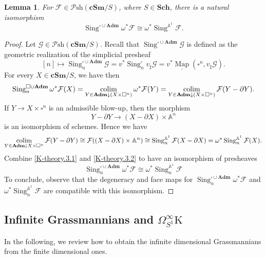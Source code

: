 \documentclass[11pt, a4paper]{amsart}
\newtheorem{lem}[thm]{Lemma}
\theoremstyle{definition}
\numberwithin{equation}{subsection}
\newcommand{\A}{\mathbb{A}}
\newcommand{\Sch}{\mathbf{Sch}}
\newcommand{\cSm}{\mathbf{cSm}}
\newcommand{\Sing}{\operatorname{Sing}}              %
\newcommand{\colimit}{\mathop{\rm colim}}
\newcommand{\Adm}{\mathbf{Adm}}
\newcommand{\Kth}{\mathrm{K}}
\newcommand{\cF}{\mathcal{F}}
\newcommand{\cG}{\mathcal{G}}
\newcommand{\boxx}{\square}
\newcommand{\infPsh}{\mathcal{P}\mathrm{sh}}
\newcommand{\Map}{\operatorname{Map}}
\begin{document}
\begin{lem}
\label{K-theory.3}
For $\cF\in \infPsh(\cSm/S)$, where $S\in \Sch$, 
there is a natural isomorphism 
\[
\Sing^{\boxx\cup \Adm}\omega^*\cF\cong  \omega^*\Sing^{\A^1}\cF.
\]
\end{lem}
\begin{proof}Let $\cG\in \infPsh(\cSm/S)$. Recall that $\Sing^{\boxx\cup \Adm}\cG$ is defined as the geometric realization of the simplicial presheaf \[[n]\mapsto \Sing_n^{\boxx\cup \Adm}\cG=v^*\Sing_n^{\boxx}v_\sharp\cG= v^*\underline{\Map}(\boxx^n, v_\sharp \cG).\]
For every $X\in \cSm/S$, 
we have then
\begin{equation}
\label{K-theory.3.1}
\Sing_n^{\boxx\cup\Adm}\omega^*\cF(X)
=
\colimit_{Y\in \Adm\downarrow (X\times \boxx^n)}\omega^*\cF(Y)
=
\colimit_{Y\in \Adm\downarrow (X\times \boxx^n)}\cF(Y-\partial Y).
\end{equation}
If $Y\to X\times \boxx^n$ is an admissible blow-up, then the morphism
\[
Y-\partial Y\to (X-\partial X)\times \A^n
\]
is an isomorphism of schemes.
Hence we have
\begin{equation}
\label{K-theory.3.2}
\colimit_{Y\in \Adm\downarrow X\times \boxx^n}\cF(Y-\partial Y)
\cong
\cF((X-\partial X)\times \A^n)
\cong
\Sing_n^{\A^1}\cF(X-\partial X)
=
\omega^*\Sing_n^{\A^1}\cF(X).
\end{equation}
Combine \eqref{K-theory.3.1} and \eqref{K-theory.3.2} to have an isomorphism of presheaves
\[
\Sing_n^{\boxx\cup\Adm}\omega^*\cF
\cong
\omega^*\Sing_n^{\A^1}\cF
\]
To conclude, 
observe that the degeneracy and face maps for $\Sing_n^{\boxx\cup\Adm}\omega^*\cF$ and $\omega^*\Sing_n^{\A^1}\cF$ 
are compatible with this isomorphism.
\end{proof}


\subsection{Infinite Grassmannians and \texorpdfstring{$\Omega_{S^1}^\infty \Kth$}{K}}

In the following,
we review how to obtain the infinite dimensional Grassmannians from the finite dimensional ones.
\end{document}
